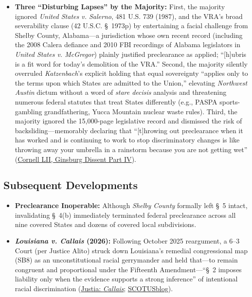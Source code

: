 \documentclass[12pt]{article}
\begin{document}
\begin{itemize}
    \item \textbf{Three ``Disturbing Lapses'' by the Majority:} First, the majority ignored \emph{United States v. Salerno}, 481 U.S. 739 (1987), and the VRA's broad severability clause (42 U.S.C. \S~1973p) by entertaining a facial challenge from Shelby County, Alabama---a jurisdiction whose own recent record (including the 2008 Calera defiance and 2010 FBI recordings of Alabama legislators in \emph{United States v. McGregor}) plainly justified preclearance as applied; ``[h]ubris is a fit word for today's demolition of the VRA.'' Second, the majority silently overruled \emph{Katzenbach}'s explicit holding that equal sovereignty ``applies only to the terms upon which States are admitted to the Union,'' elevating \emph{Northwest Austin} dictum without a word of \emph{stare decisis} analysis and threatening numerous federal statutes that treat States differently (e.g., PASPA sports-gambling grandfathering, Yucca Mountain nuclear waste rules). Third, the majority ignored the 15,000-page legislative record and dismissed the risk of backsliding---memorably declaring that ``[t]hrowing out preclearance when it has worked and is continuing to work to stop discriminatory changes is like throwing away your umbrella in a rainstorm because you are not getting wet'' (\href{https://www.law.cornell.edu/supremecourt/text/12-96}{Cornell LII, Ginsburg Dissent Part IV}).
\end{itemize}

\subsection{Subsequent Developments}

\begin{itemize}

\item \textbf{Preclearance Inoperable:} Although \emph{Shelby County} formally left \S~5 intact, invalidating \S~4(b) immediately terminated federal preclearance across all nine covered States and dozens of covered local subdivisions.

\item \textbf{\emph{Louisiana v. Callais} (2026):} Following October 2025 reargument, a 6--3 Court (per Justice Alito) struck down Louisiana's remedial congressional map (SB8) as an unconstitutional racial gerrymander and held that---to remain congruent and proportional under the Fifteenth Amendment---``\S~2 imposes liability only when the evidence supports a strong inference'' of intentional racial discrimination (\href{https://supreme.justia.com/cases/federal/us/608/24-109/}{Justia: \emph{Callais}}; \href{https://www.scotusblog.com/2026/04/in-major-voting-rights-act-case-supreme-court-strikes-down-redistricting-map-challenged-as-racia/}{SCOTUSblog}).

\end{itemize}
\end{document}
